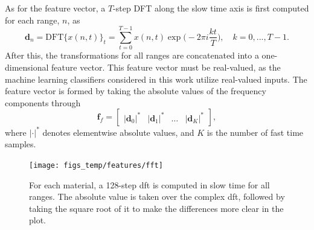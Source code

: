 
As for the feature vector, a $T$-step DFT along the slow time axis is first computed for each range, $n$, as
\begin{equation}
	\mathbf{d}_n=\text{DFT}\big\{x(n,t)\big\}_t =  \sum_{t=0}^{T-1}x(n,t)\exp\Big(-2\pi i\frac{kt}{T}\Big), \quad k=0,...,T-1.
\end{equation}
After this, the transformations for all ranges are concatenated into a one-dimensional feature vector. This feature vector must be real-valued, as the machine learning classifiers considered in this work utilize real-valued inputs. The feature vector is formed by taking the absolute values of the frequency components through
\begin{equation}
	\textbf{f}_{f}=\begin{bmatrix} |\mathbf{d}_0|^* & |\mathbf{d}_1|^* & \hdots & |\mathbf{d}_K|^* \end{bmatrix},
\end{equation}
where $|\cdot|^*$ denotes elementwise absolute values, and $K$ is the number of fast time samples.    



\begin{figure}[h]
	\centering
	\texttt{[image: figs\_temp/features/fft]}
	\caption{For each material, a 128-step \gls{dft} is computed in slow time for all ranges. The absolute value is taken over the complex \gls{dft}, followed by taking the square root of it to make the differences more clear in the plot. }
	\label{fig:fft}
\end{figure}


